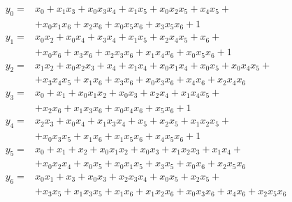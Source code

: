 \begin{equation}
    \label{eqn:misty-s7}
    \begin{array}{ll}
        y_0 =& x_0 + x_1 x_3 + x_0 x_3 x_4 + x_1 x_5 + x_0 x_2 x_5 + x_4 x_5 + \\
             & + x_0 x_1 x_6 + x_2 x_6 + x_0 x_5 x_6 + x_3 x_5 x_6 + 1 \\
        y_1 =& x_0 x_2 + x_0 x_4 +x_3 x_4 +x_1 x_5 + x_2 x_4 x_5 +x_6 + \\
             & + x_0 x_6 +x_3 x_6 +x_2 x_3 x_6 + x_1 x_4 x_6 + x_0 x_5 x_6 +1 \\
        y_2 =& x_1 x_2 + x_0 x_2 x_3 + x_4 + x_1 x_4 + x_0 x_1 x_4 + x_0 x_5 + x_0 x_4 x_5 + \\
             & + x_3 x_4 x_5 + x_1 x_6 + x_3 x_6 + x_0 x_3 x_6 + x_4 x_6 + x_2 x_4 x_6 \\
        y_3 =& x_0 + x_1 + x_0 x_1 x_2 + x_0 x_3 + x_2 x_4 + x_1 x_4 x_5 + \\
             & + x_2 x_6 + x_1 x_3 x_6 + x_0 x_4 x_6 + x_5 x_6 + 1 \\
        y_4 =& x_2 x_3 + x_0 x_4 + x_1 x_3 x_4 + x_5 + x_2 x_5 + x_1 x_2 x_5 + \\
             & + x_0 x_3 x_5 + x_1 x_6 + x_1 x_5 x_6 + x_4 x_5 x_6 + 1 \\
        y_5 =& x_0 + x_1 + x_2 + x_0 x_1 x_2 + x_0 x_3 + x_1 x_2 x_3 + x_1 x_4 + \\
             & + x_0 x_2 x_4 + x_0 x_5 + x_0 x_1 x_5 + x_3 x_5 + x_0 x_6 + x_2 x_5 x_6 \\
        y_6 =& x_0 x_1 + x_3 + x_0 x_3 + x_2 x_3 x_4 + x_0 x_5 + x_2 x_5 + \\
             & + x_3 x_5 + x_1 x_3 x_5 + x_1 x_6 + x_1 x_2 x_6 + x_0 x_3 x_6 + x_4 x_6 + x_2 x_5 x_6 \\
    \end{array}
\end{equation}

